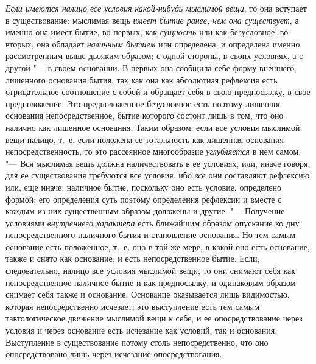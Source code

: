 {\em Если имеются налицо все условия какой-нибудь
мыслимой вещи}, то она вступает в существование: мыслимая вещь
{\em имеет бытие ранее, чем она существует}, а именно
она имеет бытие, во-первых, как {\em сущность} или как
безусловное; во-вторых, она обладает {\em наличным
бытием} или определена, и определена именно рассмотренным выше двояким
образом: с одной стороны, в своих условиях, а с другой "--- в своем основании.
В первых она сообщила себе форму внешнего, лишенного основания бытия, так
как она как абсолютная рефлексия есть отрицательное соотношение с собой и
обращает себя в свою предпосылку, в свое предположение. Это предположенное
безусловное есть поэтому лишенное основания непосредственное, бытие
которого состоит лишь в том, что оно налично как лишенное основания. Таким
образом, если все условия мыслимой вещи налицо, т.~е. если положена ее
тотальность как лишенная основания непосредственность, то это рассеянное
многообразие {\em углубляется} в нем самом. "--- Вся
мыслимая вещь должна наличествовать в ее условиях, или, иначе говоря, для
ее существования требуются все условия, ибо {\em все}
они составляют рефлексию; или, еще иначе, наличное бытие, поскольку оно
есть условие, определено формой; его определения суть поэтому определения
рефлексии и вместе с каждым из них существенным образом доложены и другие.
"--- Получение условиями {\em внутреннего характера} есть
ближайшим образом опускание ко дну непосредственного наличного бытия и
становление основания. Но тем самым основание есть положенное, т.~е. оно в
той же мере, в какой оно есть основание, также и снято как основание, и
есть непосредственное бытие. Если, следовательно, налицо все условия
мыслимой вещи, то они снимают себя как непосредственное наличное бытие и
как предпосылку, и одинаковым образом снимает себя также и основание.
Основание оказывается лишь видимостью, которая непосредственно исчезает;
это выступление есть тем самым тавтологическое движение мыслимой вещи к
себе, и ее опосредствование через условия и через основание есть исчезание
как условий, так и основания. Выступление в существование потому столь
непосредственно, что оно опосредствовано лишь через исчезание
опосредствования.

